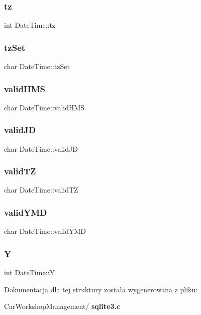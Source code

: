 \subsubsection{tz}
{\footnotesize\ttfamily int Date\+Time\+::tz}

\mbox{\label{struct_date_time_a1d3f01eb19ad909d0e2a13c25cf4e48e}} 
\subsubsection{tzSet}
{\footnotesize\ttfamily char Date\+Time\+::tz\+Set}

\mbox{\label{struct_date_time_aba26b32c6142cf6bfc09db3088b90add}} 
\subsubsection{validHMS}
{\footnotesize\ttfamily char Date\+Time\+::valid\+H\+MS}

\mbox{\label{struct_date_time_a1962742892150a03dc5d302f43efbb04}} 
\subsubsection{validJD}
{\footnotesize\ttfamily char Date\+Time\+::valid\+JD}

\mbox{\label{struct_date_time_af3dfda2bdbb2183dc1b94f449701b81e}} 
\subsubsection{validTZ}
{\footnotesize\ttfamily char Date\+Time\+::valid\+TZ}

\mbox{\label{struct_date_time_aaa042bec0879cd922039062433f4b26f}} 
\subsubsection{validYMD}
{\footnotesize\ttfamily char Date\+Time\+::valid\+Y\+MD}

\mbox{\label{struct_date_time_ad39449618b2a15128e32766a208753cf}} 
\subsubsection{Y}
{\footnotesize\ttfamily int Date\+Time\+::Y}



Dokumentacja dla tej struktury została wygenerowana z pliku\+:\begin{DoxyCompactItemize}
\item 
Car\+Workshop\+Management/\textbf{ sqlite3.\+c}\end{DoxyCompactItemize}
